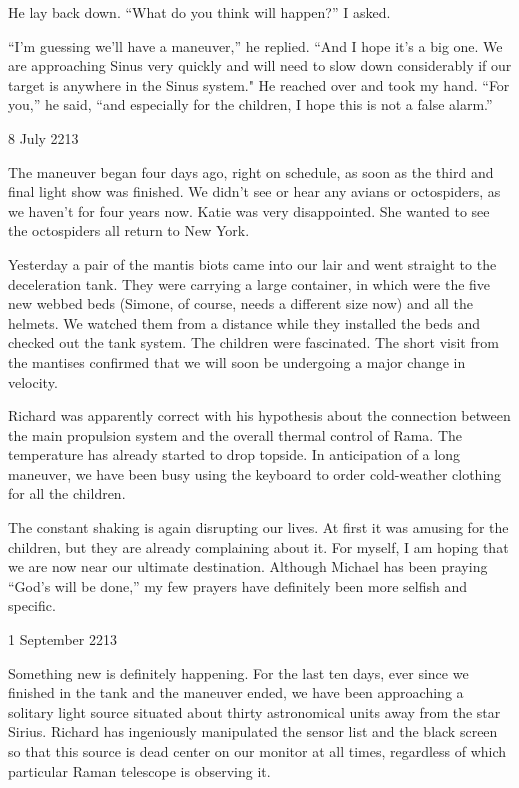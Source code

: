 \documentclass[]{article}
\begin{document}
{He lay back down.  “What do you think will happen?” I asked.

“I’m guessing we’ll have a maneuver,” he replied.  “And I hope it’s a big one.  We are approaching Sinus very quickly and will need to slow down considerably if our target is anywhere in the Sinus system."  He reached over and took my hand.  “For you,” he said, “and especially for the children, I hope this is not a false alarm.”

8 July 2213

The maneuver began four days ago, right on schedule, as soon as the third and final light show was finished.  We didn’t see or hear any avians or octospiders, as we haven’t for four years now.  Katie was very disappointed.  She wanted to see the octospiders all return to New York.

Yesterday a pair of the mantis biots came into our lair and went straight to the deceleration tank.  They were carrying a large container, in which were the five new webbed beds (Simone, of course, needs a different size now) and all the helmets.  We watched them from a distance while they installed the beds and checked out the tank system.  The children were fascinated.  The short visit from the mantises confirmed that we will soon be undergoing a major change in velocity.

Richard was apparently correct with his hypothesis about the connection between the main propulsion system and the overall thermal control of Rama.  The temperature has already started to drop topside.  In anticipation of a long maneuver, we have been busy using the keyboard to order cold-weather clothing for all the children.

The constant shaking is again disrupting our lives.  At first it was amusing for the children, but they are already complaining about it.  For myself, I am hoping that we are now near our ultimate destination.  Although Michael has been praying “God’s will be done,” my few prayers have definitely been more selfish and specific.

1 September 2213

Something new is definitely happening.  For the last ten days, ever since we finished in the tank and the maneuver ended, we have been approaching a solitary light source situated about thirty astronomical units away from the star Sirius.  Richard has ingeniously manipulated the sensor list and the black screen so that this source is dead center on our monitor at all times, regardless of which particular Raman telescope is observing it.

}
\end{document}

